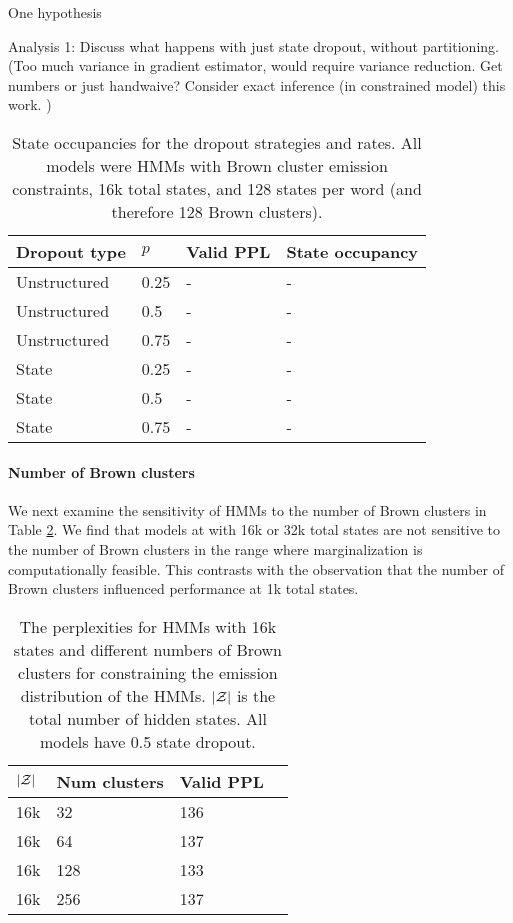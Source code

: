 \documentclass[11pt,a4paper]{article}
\begin{document}
One hypothesis 

Analysis 1: Discuss what happens with just state dropout, without partitioning.
(Too much variance in gradient estimator, would require variance reduction.
Get numbers or just handwaive?
Consider exact inference (in constrained model) this work.
)

\begin{table}[!t]
\centering
\caption{\label{tbl:dropout}
State occupancies for the dropout strategies and rates.
All models were HMMs with Brown cluster emission constraints,
16k total states, and 128 states per word (and therefore 128 Brown clusters).
}

\begin{tabular}{llll}
\toprule
Dropout type & $p$  & Valid PPL & State occupancy\\
\midrule 
Unstructured & 0.25 & -         & - \\
Unstructured & 0.5  & -         & - \\
Unstructured & 0.75 & -         & - \\
State        & 0.25 & -         & - \\
State        & 0.5  & -         & - \\
State        & 0.75 & -         & - \\
\bottomrule
\end{tabular}
\end{table}

\paragraph{Number of Brown clusters}
We next examine the sensitivity of HMMs to the number of Brown clusters
in Table \ref{tbl:ppl-spw-ablation}.
We find that models at with 16k or 32k total states
are not sensitive to the number of Brown clusters
in the range where marginalization is computationally feasible.
This contrasts with the observation that the number of Brown clusters
influenced performance at 1k total states.

\begin{table}[!t]
\centering
\caption{\label{tbl:ppl-spw-ablation}
The perplexities for HMMs with 16k states
and different numbers of Brown clusters
for constraining the emission distribution of the HMMs.
$|\mathcal{Z}|$ is the total number of hidden states.
All models have 0.5 state dropout.
}

\begin{tabular}{llll}
\toprule
$|\mathcal{Z}|$ & Num clusters & Valid PPL\\
\midrule
16k      & 32           & 136\\
16k      & 64           & 137\\
16k      & 128          & 133\\
16k      & 256          & 137\\
\bottomrule
\end{tabular}
\end{table}
\end{document}
